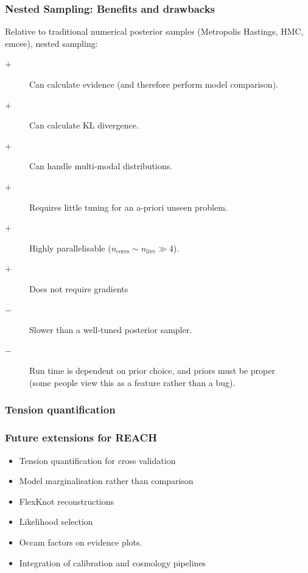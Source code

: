 \documentclass[aspectratio=169]{beamer}
\begin{document}
\begin{frame}
    \frametitle{Nested Sampling: Benefits and drawbacks}
    Relative to traditional numerical posterior samples (Metropolis Hastings, HMC, emcee), nested sampling:
    \begin{description}
        \item[$+$] Can calculate evidence (and therefore perform model comparison).
        \item[$+$] Can calculate KL divergence.
        \item[$+$] Can handle multi-modal distributions.
        \item[$+$] Requires little tuning for an a-priori unseen problem.
        \item[$+$] Highly parallelisable ($n_\mathrm{cores} \sim n_\mathrm{live} \gg 4$).
        \item[$+$] Does not require gradients
        \item[$-$] Slower than a well-tuned posterior sampler.
        \item[$-$] Run time is dependent on prior choice, and priors must be proper \\(some people view this as a feature rather than a bug).
    \end{description}
\end{frame}

\begin{frame}
    \frametitle{Tension quantification}
\end{frame}

\begin{frame}
    \frametitle{Future extensions for REACH}
    \begin{itemize}
        \item Tension quantification for cross validation
        \item Model marginalisation rather than comparison
        \item FlexKnot reconstructions
        \item Likelihood selection
        \item Occam factors on evidence plots.
        \item Integration of calibration and cosmology pipelines
    \end{itemize}
\end{frame}
\end{document}
